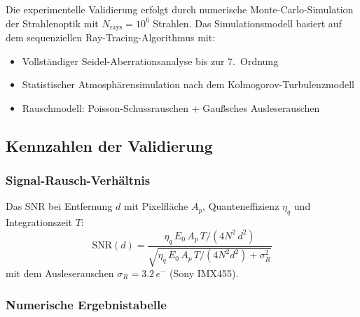﻿\documentclass[12pt,a4paper]{article}
\theoremstyle{definition}
\begin{document}
	Die experimentelle Validierung erfolgt durch numerische Monte-Carlo-Simulation
	der Strahlenoptik mit $N_\mathrm{rays} = 10^6$ Strahlen. Das Simulationsmodell
	basiert auf dem sequenziellen Ray-Tracing-Algorithmus mit:
	\begin{itemize}
		\item Vollständiger Seidel-Aberrationsanalyse bis zur 7.\ Ordnung
		\item Statistischer Atmosphärensimulation nach dem Kolmogorov-Turbulenzmodell
		\item Rauschmodell: Poisson-Schuss\-rauschen + Gaußsches Ausleserauschen
	\end{itemize}
	
	\subsection{Kennzahlen der Validierung}
	
	\subsubsection{Signal-Rausch-Verhältnis}
	
	Das SNR bei Entfernung $d$ mit Pixelfläche $A_p$, Quanteneffizienz $\eta_q$
	und Integrationszeit $T$:
	\begin{equation}
		\mathrm{SNR}(d) = \frac{\eta_q\,E_0\,A_p\,T / (4N^2\,d^2)}
		{\sqrt{\eta_q\,E_0\,A_p\,T/(4N^2 d^2) + \sigma_R^2}}
		\label{eq:snr}
	\end{equation}
	mit dem Ausleserauschen $\sigma_R = 3.2\,e^-$ (Sony IMX455).
	
	\subsubsection{Numerische Ergebnistabelle}
	
\end{document}

